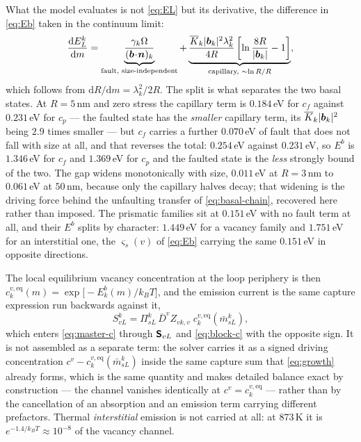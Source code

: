 What the model evaluates is not \cref{eq:EL} but its derivative, the difference
in \cref{eq:Eb} taken in the continuum limit:
\begin{equation}
  \frac{\mathrm dE_L^{k}}{\mathrm dm}
    = \underbrace{\frac{\gamma_k\Omega}{(\bm{b}\!\cdot\!\bm{n})_k}}_{\text{fault, size-independent}}
    + \underbrace{\frac{\overline K_k|\bm{b}_k|^{2}\lambda_k^{2}}{4R}
      \left[\ln\frac{8R}{|\bm{b}_k|}-1\right]}_{\text{capillary, }\sim\ln R/R} ,
  \label{eq:dEdm}
\end{equation}
which follows from $\mathrm dR/\mathrm dm=\lambda_k^{2}/2R$. The split is what
separates the two basal states. At $R=5\,$nm and zero stress the capillary term
is $0.184\,$eV for $c_f$ against $0.231\,$eV for $c_p$ --- the faulted state has
the \emph{smaller} capillary term, its $\overline K_k|\bm{b}_k|^{2}$ being $2.9$
times smaller --- but $c_f$ carries a further $0.070\,$eV of fault that does not
fall with size at all, and that reverses the total: $0.254\,$eV against
$0.231\,$eV, so $E^{b}$ is $1.346\,$eV for $c_f$ and $1.369\,$eV for $c_p$ and
the faulted state is the \emph{less} strongly bound of the two. The gap widens
monotonically with size, $0.011\,$eV at $R=3\,$nm to $0.061\,$eV at $50\,$nm,
because only the capillary halves decay; that widening is the driving force
behind the unfaulting transfer of \cref{eq:basal-chain}, recovered here rather
than imposed. The prismatic families sit at $0.151\,$eV with no fault term at
all, and their $E^{b}$ splits by character: $1.449\,$eV for a vacancy family and
$1.751\,$eV for an interstitial one, the $\varsigma_s(v)$ of \cref{eq:Eb}
carrying the same $0.151\,$eV in opposite directions.

The local equilibrium vacancy concentration at the loop periphery is then
$c^{v,\mathrm{eq}}_k(m)=\exp\bigl[-E^{b}_k(m)/k_BT\bigr]$, and the
emission current is the same capture expression run backwards against it,
\begin{equation}
  S^{k}_{vL}=\Pi^k_{sL}\,\overline D^{v}Z_{vk,v}\;
             c^{v,\mathrm{eq}}_k(\bar m^k_{sL}),
  \label{eq:Semit}
\end{equation}
which enters \cref{eq:master-c} through $\bm{\mathsf{S}}_{vL}$ and
\cref{eq:block-c} with the opposite sign. It is not assembled as a separate
term: the solver carries it as a signed driving concentration
$c^{v}-c^{v,\mathrm{eq}}_k(\bar m^k_{sL})$ inside the same capture sum that
\cref{eq:growth} already forms, which is the same quantity and makes detailed
balance exact by construction --- the channel vanishes identically at
$c^{v}=c^{v,\mathrm{eq}}_k$ --- rather than by the cancellation of an absorption
and an emission term carrying different prefactors. Thermal \emph{interstitial}
emission is not carried at all: at $873\,$K it is $e^{-1.4/k_BT}\approx10^{-8}$
of the vacancy channel.

